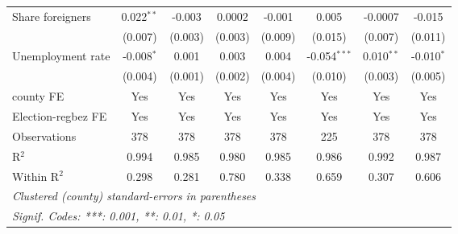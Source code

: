 \begin{table}[htbp]
\begin{tabular}{lccccccc}
      Share foreigners                                        & 0.022$^{**}$  & -0.003       & 0.0002         & -0.001        & 0.005          & -0.0007        & -0.015\\   
                                                              & (0.007)       & (0.003)      & (0.003)        & (0.009)       & (0.015)        & (0.007)        & (0.011)\\   
      Unemployment rate                                       & -0.008$^{*}$  & 0.001        & 0.003          & 0.004         & -0.054$^{***}$ & 0.010$^{**}$   & -0.010$^{*}$\\   
                                                              & (0.004)       & (0.001)      & (0.002)        & (0.004)       & (0.010)        & (0.003)        & (0.005)\\   
      county FE                                               & Yes           & Yes          & Yes            & Yes           & Yes            & Yes            & Yes\\  
      Election-regbez FE                                      & Yes           & Yes          & Yes            & Yes           & Yes            & Yes            & Yes\\  
      Observations                                            & 378           & 378          & 378            & 378           & 225            & 378            & 378\\  
      R$^2$                                                   & 0.994         & 0.985        & 0.980          & 0.985         & 0.986          & 0.992          & 0.987\\  
      Within R$^2$                                            & 0.298         & 0.281        & 0.780          & 0.338         & 0.659          & 0.307          & 0.606\\  
      \midrule \midrule
      \multicolumn{8}{l}{\emph{Clustered (county) standard-errors in parentheses}}\\
      \multicolumn{8}{l}{\emph{Signif. Codes: ***: 0.001, **: 0.01, *: 0.05}}\\
   \end{tabular}
\end{table}


